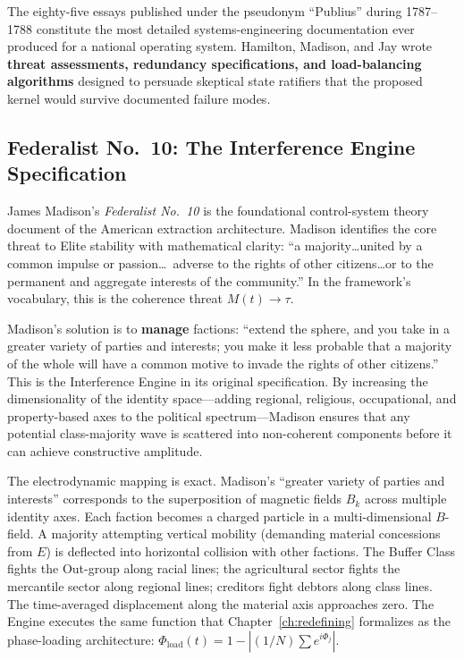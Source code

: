 The eighty-five essays published under the pseudonym ``Publius'' during 1787--1788 constitute the most detailed systems-engineering documentation ever produced for a national operating system. Hamilton, Madison, and Jay wrote \textbf{threat assessments, redundancy specifications, and load-balancing algorithms} designed to persuade skeptical state ratifiers that the proposed kernel would survive documented failure modes.

\subsection{Federalist No.~10: The Interference Engine Specification}

James Madison's \textit{Federalist No.~10} is the foundational control-system theory document of the American extraction architecture. Madison identifies the core threat to Elite stability with mathematical clarity: ``a majority\ldots united by a common impulse or passion\ldots\ adverse to the rights of other citizens\ldots or to the permanent and aggregate interests of the community.'' In the framework's vocabulary, this is the coherence threat $M(t) \rightarrow \tau$.

Madison's solution is to \textbf{manage} factions: ``extend the sphere, and you take in a greater variety of parties and interests; you make it less probable that a majority of the whole will have a common motive to invade the rights of other citizens.'' This is the Interference Engine in its original specification. By increasing the dimensionality of the identity space---adding regional, religious, occupational, and property-based axes to the political spectrum---Madison ensures that any potential class-majority wave is scattered into non-coherent components before it can achieve constructive amplitude.

The electrodynamic mapping is exact. Madison's ``greater variety of parties and interests'' corresponds to the superposition of magnetic fields $B_k$ across multiple identity axes. Each faction becomes a charged particle in a multi-dimensional $B$-field. A majority attempting vertical mobility (demanding material concessions from $E$) is deflected into horizontal collision with other factions. The Buffer Class fights the Out-group along racial lines; the agricultural sector fights the mercantile sector along regional lines; creditors fight debtors along class lines. The time-averaged displacement along the material axis approaches zero. The Engine executes the same function that Chapter~\ref{ch:redefining} formalizes as the phase-loading architecture: $\Phi_{\text{load}}(t) = 1 - |(1/N) \sum e^{i\Phi_j}|$.

